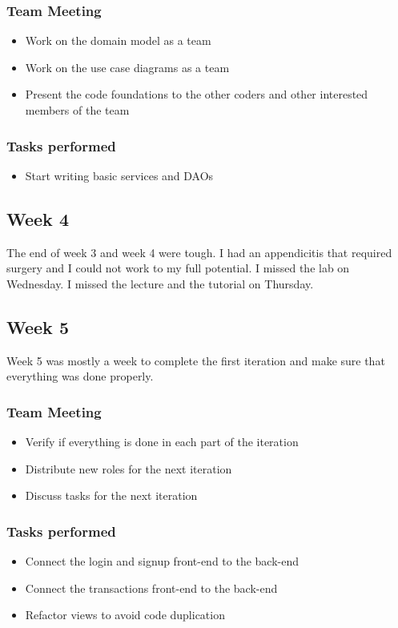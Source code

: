 \documentclass[12pt]{article}
\begin{document}
\subsubsection{Team Meeting}
\begin{itemize}
    \item Work on the domain model as a team
    \item Work on the use case diagrams as a team
    \item Present the code foundations to the other coders and other interested members of the team
\end{itemize}

\subsubsection{Tasks performed}
\begin{itemize}
    \item Start writing basic services and DAOs
\end{itemize}

\subsection{Week 4}
The end of week 3 and week 4 were tough.
I had an appendicitis that required surgery and I could not work to my full potential.
I missed the lab on Wednesday.
I missed the lecture and the tutorial on Thursday.

\subsection{Week 5}
Week 5 was mostly a week to complete the first iteration and make sure that everything was done properly.

\subsubsection{Team Meeting}
\begin{itemize}
    \item Verify if everything is done in each part of the iteration
    \item Distribute new roles for the next iteration
    \item Discuss tasks for the next iteration
\end{itemize}

\subsubsection{Tasks performed}
\begin{itemize}
    \item Connect the login and signup front-end to the back-end
    \item Connect the transactions front-end to the back-end
    \item Refactor views to avoid code duplication
\end{itemize}
\end{document}

